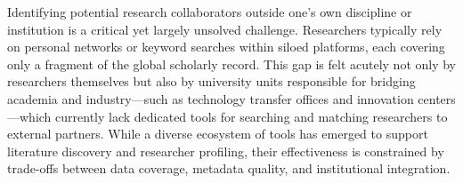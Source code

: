 \documentclass[sigconf, nonacm]{acmart}
\begin{document}

Identifying potential research collaborators outside one's own discipline or institution is a critical yet largely unsolved challenge. Researchers typically rely on personal networks or keyword searches within siloed platforms, each covering only a fragment of the global scholarly record. This gap is felt acutely not only by researchers themselves but also by university units responsible for bridging academia and industry---such as technology transfer offices and innovation centers---which currently lack dedicated tools for searching and matching researchers to external partners. While a diverse ecosystem of tools has emerged to support literature discovery and researcher profiling, their effectiveness is constrained by trade-offs between data coverage, metadata quality, and institutional integration.
\end{document}
